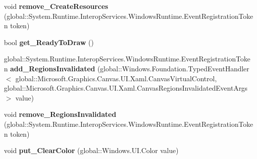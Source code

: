 \begin{DoxyCompactItemize}
\item 
\mbox{\label{interface_microsoft_1_1_graphics_1_1_canvas_1_1_u_i_1_1_xaml_1_1_i_canvas_virtual_control_af71d0732162524cbb84e8775794f761d}} 
void {\bfseries remove\+\_\+\+Create\+Resources} (global\+::\+System.\+Runtime.\+Interop\+Services.\+Windows\+Runtime.\+Event\+Registration\+Token token)
\item 
\mbox{\label{interface_microsoft_1_1_graphics_1_1_canvas_1_1_u_i_1_1_xaml_1_1_i_canvas_virtual_control_ad0524adf9910c3dfd2d10699b71f28d0}} 
bool {\bfseries get\+\_\+\+Ready\+To\+Draw} ()
\item 
\mbox{\label{interface_microsoft_1_1_graphics_1_1_canvas_1_1_u_i_1_1_xaml_1_1_i_canvas_virtual_control_a7d37fb0b34072ecd8bc9f32712ea4cba}} 
global\+::\+System.\+Runtime.\+Interop\+Services.\+Windows\+Runtime.\+Event\+Registration\+Token {\bfseries add\+\_\+\+Regions\+Invalidated} (global\+::\+Windows.\+Foundation.\+Typed\+Event\+Handler$<$ global\+::\+Microsoft.\+Graphics.\+Canvas.\+U\+I.\+Xaml.\+Canvas\+Virtual\+Control, global\+::\+Microsoft.\+Graphics.\+Canvas.\+U\+I.\+Xaml.\+Canvas\+Regions\+Invalidated\+Event\+Args $>$ value)
\item 
\mbox{\label{interface_microsoft_1_1_graphics_1_1_canvas_1_1_u_i_1_1_xaml_1_1_i_canvas_virtual_control_afe949e744dadc9f5e39dfec072c67406}} 
void {\bfseries remove\+\_\+\+Regions\+Invalidated} (global\+::\+System.\+Runtime.\+Interop\+Services.\+Windows\+Runtime.\+Event\+Registration\+Token token)
\item 
\mbox{\label{interface_microsoft_1_1_graphics_1_1_canvas_1_1_u_i_1_1_xaml_1_1_i_canvas_virtual_control_a84b465dc31a0ee833f01ee8a2c9191af}} 
void {\bfseries put\+\_\+\+Clear\+Color} (global\+::\+Windows.\+U\+I.\+Color value)
\item 
\mbox{\label{interface_microsoft_1_1_graphics_1_1_canvas_1_1_u_i_1_1_xaml_1_1_i_canvas_virtual_control_a69a389035bbca3cc303b09429c228178}} 

\end{DoxyCompactItemize}
